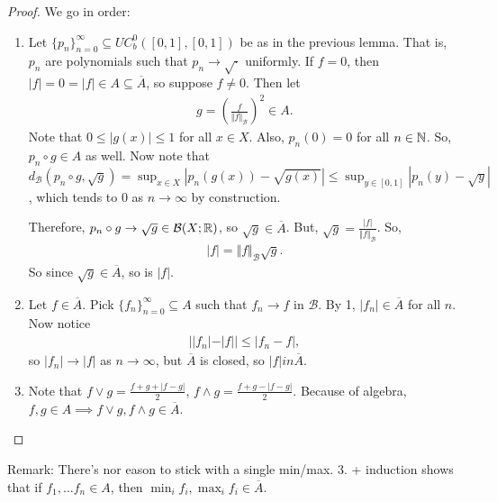 \documentclass{report}
\begin{document}
\begin{proof} We go in order:
    \begin{enumerate}
        \item Let $\{p_n\}_{n=0}^\infty \subseteq UC_b^0( [0, 1], [0,1])$ be as in the previous lemma. That is, $p_n$ are polynomials such that $p_n \to \sqrt \cdot$ uniformly. If $f = 0$, then $|f| = 0 = |f| \in A \subseteq \overline A$, so suppose $f \neq 0$. Then let 
        \begin{align*}
            g = \left(\frac{f}{\Vert f \Vert_{\mathcal B}}\right)^2 \in A.
        \end{align*}
        Note that $0 \leq |g(x)| \leq 1$ for all $x \in X$. Also, $p_n(0) = 0$ for all $n \in \NN$. So, $p_n \circ g \in A$ as well. Now note that $d_{\mathcal B} (p_n \circ g,\sqrt g) = \sup_{x \in X} |p_n(g(x)) - \sqrt{g(x)}| \leq \sup_{y \in [0,1]} |p_n(y) - \sqrt y|$, which tends to 0 as $n \to \infty$ by construction. 
        
        Therefore, $p_n \circ g \to \sqrt g \in \mathcal B(X; \RR)$, so $\sqrt{g} \in \overline A$. But, $\sqrt g = \frac{|f|}{\Vert f \Vert_{\mathcal B}}$. So,
        \begin{align*}
            |f| = \Vert f \Vert_{\mathcal B} \sqrt{g}.
        \end{align*}
        So since $\sqrt g \in \overline A$, so is $|f|$. 
        \item Let $f \in \overline A$. Pick $\{f_n\}_{n=0}^\infty \subseteq A$ such that $f_n \to f$ in $\mathcal B$. By 1, $|f_n| \in \overline A$ for all $n$. Now notice 
        \begin{align*}
            | |f_n| - |f|| \leq |f_n - f|,
        \end{align*}
        so $|f_n| \to |f|$ as $n \to \infty$, but $\overline A$ is closed, so $|f| in \overline A$. 
        \item Note that $f \vee g = \frac{f + g + |f-g|}{2}$, $f \wedge g = \frac{f + g - |f-g|}{2}$. Because of algebra, $f,g \in A \implies f \vee g, f \wedge g \in \overline A$.
    \end{enumerate}
\end{proof}
\noindent Remark: There's nor eason to stick with a single min/max. 3. + induction shows that if $f_1, \ldots f_n \in A$, then $\min_{i} f_i, \max_i f_i \in \overline A$. 
\end{document}
